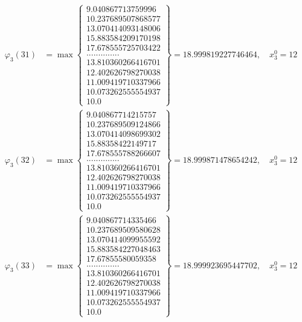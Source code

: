 \documentclass{article}
\begin{document}
\begin{align*}
  
  
  
\varphi_{3}(31) &= \max \left\{ \begin{array}{c}
9.040867713759996 \\
 10.237689507868577 \\
 13.070414093148006 \\
 15.883584209170198 \\
 17.678555725703422 \\
 .............. \\
 13.810360266416701 \\
 12.402626798270038 \\
 11.009419710337966 \\
 10.073262555554937 \\
 10.0
\end{array} \right\} = 18.999819227746464, \quad x_{3}^0 = 12\\
  
  
  
  
\varphi_{3}(32) &= \max \left\{ \begin{array}{c}
9.040867714215757 \\
 10.237689509124866 \\
 13.070414098699302 \\
 15.88358422149717 \\
 17.678555788266607 \\
 .............. \\
 13.810360266416701 \\
 12.402626798270038 \\
 11.009419710337966 \\
 10.073262555554937 \\
 10.0
\end{array} \right\} = 18.999871478654242, \quad x_{3}^0 = 12\\
  
  
  
  
\varphi_{3}(33) &= \max \left\{ \begin{array}{c}
9.040867714335466 \\
 10.237689509580628 \\
 13.070414099955592 \\
 15.883584227048463 \\
 17.67855580059358 \\
 .............. \\
 13.810360266416701 \\
 12.402626798270038 \\
 11.009419710337966 \\
 10.073262555554937 \\
 10.0
\end{array} \right\} = 18.999923695447702, \quad x_{3}^0 = 12\\
  

\end{align*}
\end{document}
